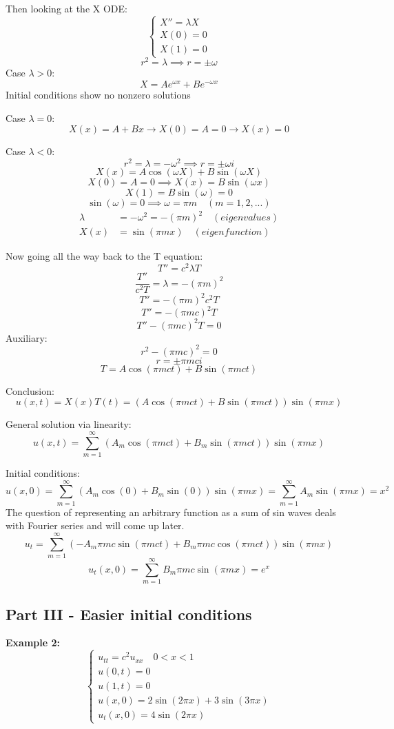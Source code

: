 \documentclass[12pt]{article}
\begin{document}
Then looking at the X ODE:
\[\begin{cases}
    X'' = \lambda X\\
    X(0) = 0\\
    X(1) = 0
\end{cases}\]
\[r^2 = \lambda \implies r = \pm \omega\]
Case $\lambda > 0$:
\[X = Ae^{\omega x} + Be^{-\omega x}\]
Initial conditions show no nonzero solutions

Case $\lambda = 0$:
\[X(x) = A + Bx \longrightarrow X(0) =A  =0  \longrightarrow X(x) = 0\]

Case $\lambda < 0$:
\[r^2 = \lambda = - \omega^2 \implies r = \pm \omega i\]
\[X(x) = A \cos(\omega X) + B\sin(\omega X)\]
\[X(0) = A = 0 \implies X(x) = B\sin(\omega x)\]
\[X(1) = B\sin(\omega) = 0\]
\[\sin(\omega) = 0 \implies \omega = \pi m \quad (m = 1, 2, ...)\]
\begin{align*}
    \lambda &= -\omega^2 = -(\pi m)^2 \quad (eigenvalues)\\
    X(x) &= \sin(\pi m x) \quad (eigenfunction)
\end{align*}

Now going all the way back to the T equation:
\[T'' = c^2\lambda T\]
\[\frac{T''}{c^2T} = \lambda = -(\pi m)^2\]
\[T'' = -(\pi m)^2 c^2 T\]
\[T'' = -(\pi m c)^2T \]
\[T'' -(\pi m c)^2T =0\]
Auxiliary:
\[r^2 - (\pi m c)^2 = 0\]
\[r = \pm \pi m ci\]
\[T = A\cos(\pi m ct) + B\sin(\pi mct)\]

Conclusion:
\[u(x, t) = X(x)T(t) = (A\cos(\pi m ct) + B\sin(\pi mct)) \sin(\pi m x)\]

General solution via linearity:
\[\boxed{u(x, t) = \sum_{m=1}^\infty (A_m\cos(\pi m ct) + B_m\sin(\pi mct)) \sin(\pi m x)}\]
 
Initial conditions:
\[u(x, 0) = \sum_{m=1}^\infty (A_m\cos(0) + B_m\sin(0)) \sin(\pi m x) = \sum_{m=1}^\infty A_m \sin(\pi m x) = x^2\]
The question of representing an arbitrary function as a sum of sin waves deals with Fourier series and will come up later.
\[u_t = \sum_{m=1}^\infty (-A_m\pi m c \sin(\pi m ct) + B_m \pi m c \cos(\pi mct)) \sin(\pi mx)\]
\[u_t(x, 0 ) = \sum_{m=1}^\infty B_m \pi mc\sin(\pi mx) = e^x\]

\subsection*{Part III - Easier initial conditions}
\textbf{Example 2:}
\[\begin{cases}
    u_{tt} = c^2 u_{xx} \quad 0 < x < 1\\
    u(0, t) = 0\\
    u(1, t) = 0\\
    u(x, 0) = 2\sin(2\pi x) + 3\sin(3\pi x)\\
    u_t(x, 0) = 4\sin(2\pi x)
\end{cases}\] 
\end{document}
